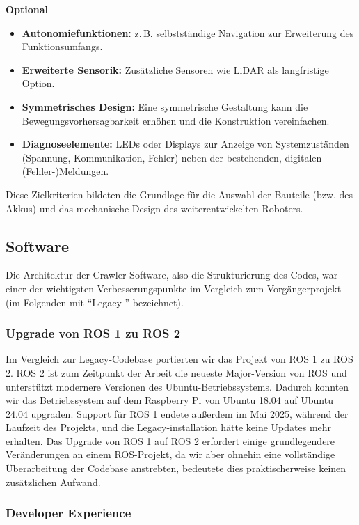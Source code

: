 \textbf{Optional}
\begin{itemize}
  \item \textbf{Autonomiefunktionen:} z.\,B. selbstständige Navigation zur Erweiterung des Funktionsumfangs.
  \item \textbf{Erweiterte Sensorik:} Zusätzliche Sensoren wie LiDAR als langfristige Option.
  \item \textbf{Symmetrisches Design:} Eine symmetrische Gestaltung kann die Bewegungsvorhersagbarkeit erhöhen und die Konstruktion vereinfachen.
  \item \textbf{Diagnoseelemente:} LEDs oder Displays zur Anzeige von Systemzuständen (Spannung, Kommunikation, Fehler) neben der bestehenden, digitalen (Fehler-)Meldungen.
\end{itemize}

Diese Zielkriterien bildeten die Grundlage für die Auswahl der Bauteile (bzw. des Akkus) und das mechanische Design des weiterentwickelten Roboters.

\subsection{Software}

Die Architektur der Crawler-Software, also die Strukturierung des Codes, war einer der wichtigsten Verbesserungspunkte im Vergleich zum Vorgängerprojekt (im Folgenden mit ``Legacy-'' bezeichnet). 


\subsubsection{Upgrade von ROS 1 zu ROS 2}

Im Vergleich zur Legacy-Codebase portierten wir das Projekt von ROS 1 zu ROS 2. ROS 2 ist zum Zeitpunkt der Arbeit die neueste Major-Version von ROS und unterstützt modernere Versionen des Ubuntu-Betriebssystems. Dadurch konnten wir das Betriebssystem auf dem Raspberry Pi von Ubuntu 18.04 auf Ubuntu 24.04 upgraden. Support für ROS 1 endete außerdem im Mai 2025, während der Laufzeit des Projekts, und die Legacy-installation hätte keine Updates mehr erhalten. Das Upgrade von ROS 1 auf ROS 2 erfordert einige grundlegendere Veränderungen an einem ROS-Projekt, da wir aber ohnehin eine vollständige Überarbeitung der Codebase anstrebten, bedeutete dies praktischerweise keinen zusätzlichen Aufwand. 

\subsubsection{Developer Experience}

